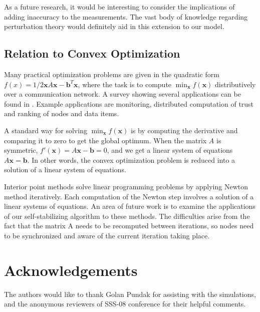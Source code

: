 \documentclass[preprint,12pt]{elsarticle}
\newcommand{\xx}{\mathbf{x}}
\newcommand{\bb}{\mathbf{b}}
\begin{document}
As a future research, it would be interesting to consider the
implications of adding inaccuracy to the measurements. The vast
body of knowledge regarding perturbation theory would definitely
aid in this extension to our model.

\subsection{Relation to Convex Optimization}
Many practical optimization problems are given in the quadratic
form $f(x) = 1/2\xx A\xx - \bb^T\xx$, where the task is to compute
$\min_{\xx} f(\xx)$ distributively over a communication network. A
survey showing several applications can be found in \cite{PPNA08}.
Example applications are monitoring, distributed computation of
trust and ranking of nodes and data items.

A standard way for solving $\min_{\xx} f(\xx)$ is by computing the
derivative and comparing it to zero to get the global optimum.
When the matrix $A$ is symmetric, $f'(\xx) = A\xx -\bb = 0$, and we get
a linear system of equations $A\xx = \bb$. In other words, the convex
optimization problem is reduced into a solution of a linear system
of equations.

Interior point methods \cite[Ch. 11]{BV04} solve linear programming
problems by applying Newton method iteratively. Each computation
of the Newton step involves a solution of a linear systems of
equations. An area of future work is to examine the applications
of our self-stabilizing algorithm to these methods. The
difficulties arise from the fact that the matrix A needs to be
recomputed between iterations, so nodes need to be synchronized
and aware of the current iteration taking place.

\section*{Acknowledgements}
The authors would like to thank Golan Pundak for
assisting with the simulations, and the anonymous reviewers of SSS-08 conference
for their helpful comments.




\end{document}
